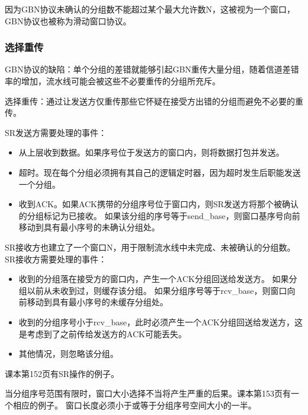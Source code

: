 \documentclass[a4paper,left=2.5cm,right=2.5cm,11pt]{article}
\begin{document}
	因为GBN协议未确认的分组数不能超过某个最大允许数N，这被视为一个窗口，GBN协议也被称为滑动窗口协议。

\subsubsection{选择重传}
	GBN协议的缺陷：单个分组的差错就能够引起GBN重传大量分组，随着信道差错率的增加，流水线可能会被这些不必要重传的分组所充斥。\par

	选择重传：通过让发送方仅重传那些它怀疑在接受方出错的分组而避免不必要的重传。\par

	SR发送方需要处理的事件：
	\begin{itemize}
		\item 从上层收到数据。如果序号位于发送方的窗口内，则将数据打包并发送。
		\item 超时。现在每个分组必须拥有其自己的逻辑定时器，因为超时发生后职能发送一个分组。
		\item 收到ACK。如果ACK携带的分组序号位于窗口内，则SR发送方将那个被确认的分组标记为已接收。
			  如果该分组的序号等于send\_base，则窗口基序号向前移动到具有最小序号的未确认分组处。
	\end{itemize}

	SR接收方也建立了一个窗口N，用于限制流水线中未完成、未被确认的分组数。
	SR接收方需要处理的事件：
	\begin{itemize}
		\item 收到的分组落在接受方的窗口内，产生一个ACK分组回送给发送方。
			  如果分组以前从未收到过，则缓存该分组。
			  如果分组序号等于rcv\_base，则窗口向前移动到具有最小序号的未缓存分组处。
		\item 收到的分组序号小于rcv\_base，此时必须产生一个ACK分组回送给发送方，这是考虑到了之前传给发送方的ACK可能丢失。
		\item 其他情况，则忽略该分组。
	\end{itemize}

	课本第152页有SR操作的例子。\par

	当分组序号范围有限时，窗口大小选择不当将产生严重的后果。课本第153页有一个相应的例子。
	窗口长度必须小于或等于分组序号空间大小的一半。\par
\end{document}
